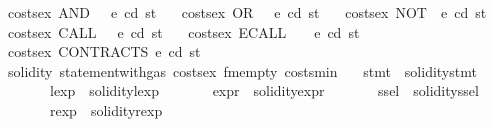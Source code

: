 \begin{isabellebody}
{\isacharbar}{\kern0pt}\ {\isachardoublequoteopen}costs{\isacharunderscore}{\kern0pt}ex\ {\isacharparenleft}{\kern0pt}AND\ {\isacharunderscore}{\kern0pt}\ {\isacharunderscore}{\kern0pt}{\isacharparenright}{\kern0pt}\ e\ cd\ st\ {\isacharequal}{\kern0pt}\ {}{\isachardoublequoteclose}\isanewline
{\isacharbar}{\kern0pt}\ {\isachardoublequoteopen}costs{\isacharunderscore}{\kern0pt}ex\ {\isacharparenleft}{\kern0pt}OR\ {\isacharunderscore}{\kern0pt}\ {\isacharunderscore}{\kern0pt}{\isacharparenright}{\kern0pt}\ e\ cd\ st\ {\isacharequal}{\kern0pt}\ {}{\isachardoublequoteclose}\isanewline
{\isacharbar}{\kern0pt}\ {\isachardoublequoteopen}costs{\isacharunderscore}{\kern0pt}ex\ {\isacharparenleft}{\kern0pt}NOT\ {\isacharunderscore}{\kern0pt}{\isacharparenright}{\kern0pt}\ e\ cd\ st\ {\isacharequal}{\kern0pt}\ {}{\isachardoublequoteclose}\isanewline
{\isacharbar}{\kern0pt}\ {\isachardoublequoteopen}costs{\isacharunderscore}{\kern0pt}ex\ {\isacharparenleft}{\kern0pt}CALL\ {\isacharunderscore}{\kern0pt}\ {\isacharunderscore}{\kern0pt}{\isacharparenright}{\kern0pt}\ e\ cd\ st\ {\isacharequal}{\kern0pt}\ {}{\isachardoublequoteclose}\isanewline
{\isacharbar}{\kern0pt}\ {\isachardoublequoteopen}costs{\isacharunderscore}{\kern0pt}ex\ {\isacharparenleft}{\kern0pt}ECALL\ {\isacharunderscore}{\kern0pt}\ {\isacharunderscore}{\kern0pt}\ {\isacharunderscore}{\kern0pt}{\isacharparenright}{\kern0pt}\ e\ cd\ st\ {\isacharequal}{\kern0pt}\ {}{\isachardoublequoteclose}\isanewline
{\isacharbar}{\kern0pt}\ {\isachardoublequoteopen}costs{\isacharunderscore}{\kern0pt}ex\ CONTRACTS\ e\ cd\ st\ {\isacharequal}{\kern0pt}\ {}{\isachardoublequoteclose}\isanewline
\isanewline
{}\isamarkupfalse%
\ solidity{\isacharcolon}{\kern0pt}\ statement{\isacharunderscore}{\kern0pt}with{\isacharunderscore}{\kern0pt}gas\ costs{\isacharunderscore}{\kern0pt}ex\ fmempty\ costs{\isacharunderscore}{\kern0pt}min\isanewline
\ \ \ stmt\ {\isacharequal}{\kern0pt}\ {\isachardoublequoteopen}solidity{\isachardot}{\kern0pt}stmt{\isachardoublequoteclose}\ \isanewline
\ \ \ \ \ \ \ lexp\ {\isacharequal}{\kern0pt}\ solidity{\isachardot}{\kern0pt}lexp\isanewline
\ \ \ \ \ \ \ expr\ {\isacharequal}{\kern0pt}\ solidity{\isachardot}{\kern0pt}expr\isanewline
\ \ \ \ \ \ \ ssel\ {\isacharequal}{\kern0pt}\ solidity{\isachardot}{\kern0pt}ssel\isanewline
\ \ \ \ \ \ \ rexp\ {\isacharequal}{\kern0pt}\ solidity{\isachardot}{\kern0pt}rexp\isanewline

\end{isabellebody}
